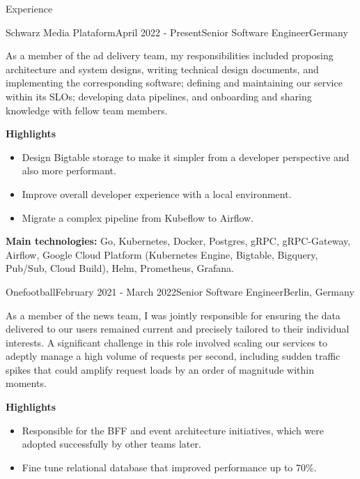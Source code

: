 \documentclass[
	a4paper, %
	10pt, %
]{resume} %
\begin{document}
\begin{rSection}{Experience}

	\begin{rSubsection}{Schwarz Media Plataform}{April 2022 - Present}{Senior Software Engineer}{Germany}
		\item[]

		As a member of the ad delivery team, my responsibilities included proposing architecture and system designs, writing technical design documents, and implementing the corresponding software; defining and maintaining our service within its SLOs; developing data pipelines, and onboarding and sharing knowledge with fellow team members.

		\textbf{Highlights}
		\begin{itemize}
			\item Design Bigtable storage to make it simpler from a developer perspective and also more performant.
			\item Improve overall developer experience with a local environment.
			\item Migrate a complex pipeline from Kubeflow to Airflow.
		\end{itemize}

		\textbf{Main technologies:}
			Go, Kubernetes, Docker, Postgres, gRPC, gRPC-Gateway, Airflow, Google Cloud Platform (Kubernetes Engine, Bigtable, Bigquery, Pub/Sub, Cloud Build), Helm, Prometheus, Grafana.

	\end{rSubsection}

	\vspace{1mm}

	\begin{rSubsection}{Onefootball}{February 2021 - March 2022}{Senior Software Engineer}{Berlin, Germany}
		\item[]

			As a member of the news team, I was jointly responsible for ensuring the data delivered to our users remained current and precisely tailored to their individual interests.
			A significant challenge in this role involved scaling our services to adeptly manage a high volume of requests per second, including sudden traffic spikes that could amplify request loads by an order of magnitude within moments.

		\textbf{Highlights}
		\begin{itemize}
			\item Responsible for the BFF and event architecture initiatives, which were adopted successfully by other teams later.
			\item Fine tune relational database that improved performance up to 70\%.
		\end{itemize}


\end{rSubsection}
\end{rSection}
\end{document}
